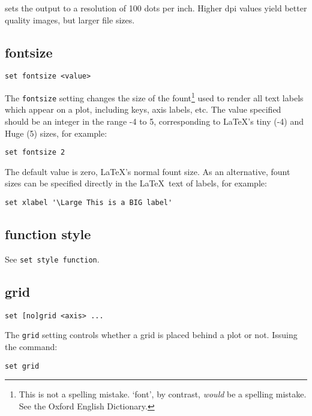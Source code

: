 \noindent sets the output to a resolution of 100 dots per inch. Higher dpi
values yield better quality images, but larger file sizes.

\subsection{fontsize}

\begin{verbatim}
set fontsize <value>
\end{verbatim}

The {\tt fontsize} setting changes the size of the fount\footnote{This is not a
spelling mistake. `font', by contrast, \textit{would} be a spelling mistake. See the
Oxford English Dictionary.} used to render all text labels which appear on a
plot, including keys, axis labels, etc. The value specified should be an integer
in the range -4 to 5, corresponding to \LaTeX's tiny (-4) and Huge (5) sizes,
for example:

\begin{verbatim}
set fontsize 2
\end{verbatim}

The default value is zero, \LaTeX's normal fount size. As an alternative, fount
sizes can be specified directly in the \LaTeX\ text of labels, for example:

\begin{verbatim}
set xlabel '\Large This is a BIG label'
\end{verbatim}

\subsection{function style}

See {\tt set style function}.

\subsection{grid}

\begin{verbatim}
set [no]grid <axis> ...
\end{verbatim}

The {\tt grid} setting controls whether a grid is placed behind a plot or not.
Issuing the command:

\begin{verbatim}
set grid
\end{verbatim}

